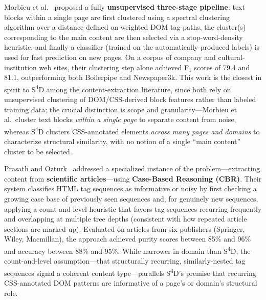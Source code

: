 Morbieu et al.~\cite{morbieu2020kernix} proposed a fully \textbf{unsupervised three-stage pipeline}: text blocks within a single page are first clustered using a spectral clustering algorithm over a distance defined on weighted DOM tag-paths, the cluster(s) corresponding to the main content are then selected via a stop-word-density heuristic, and finally a classifier (trained on the automatically-produced labels) is used for fast prediction on new pages. On a corpus of company and cultural-institution web sites, their clustering step alone achieved F$_1$ scores of 79.4 and 81.1, outperforming both Boilerpipe and Newspaper3k. This work is the closest in spirit to S\textsuperscript{4}D among the content-extraction literature, since both rely on unsupervised clustering of DOM/CSS-derived block features rather than labeled training data; the crucial distinction is scope and granularity---Morbieu et al.\ cluster text blocks \emph{within a single page} to separate content from noise, whereas S\textsuperscript{4}D clusters CSS-annotated elements \emph{across many pages and domains} to characterize structural similarity, with no notion of a single ``main content'' cluster to be selected.

Prasath and Ozturk~\cite{prasath2016cbr} addressed a specialized instance of the problem---extracting content from \textbf{scientific articles}---using \textbf{Case-Based Reasoning (CBR)}. Their system classifies HTML tag sequences as informative or noisy by first checking a growing case base of previously seen sequences and, for genuinely new sequences, applying a count-and-level heuristic that favors tag sequences recurring frequently and overlapping at multiple tree depths (consistent with how repeated article sections are marked up). Evaluated on articles from six publishers (Springer, Wiley, Macmillan), the approach achieved purity scores between 85\% and 96\% and accuracy between 88\% and 95\%. While narrower in domain than S\textsuperscript{4}D, the count-and-level assumption---that structurally recurring, similarly-nested tag sequences signal a coherent content type---parallels S\textsuperscript{4}D's premise that recurring CSS-annotated DOM patterns are informative of a page's or domain's structural role.

